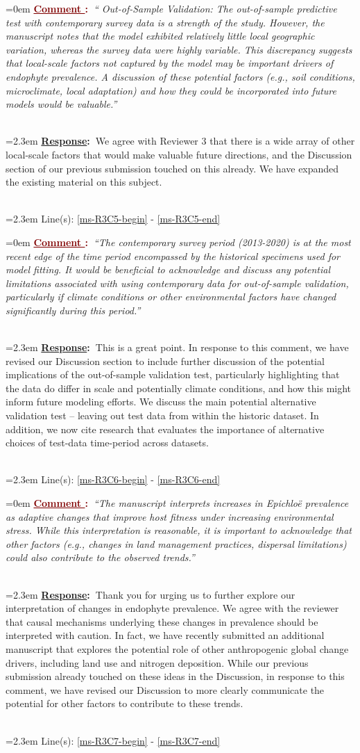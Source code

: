 \documentclass[12pt]{article}
\newcounter{cN}
\newcommand{\comment}[1]{
	\vspace{2em}
	\refstepcounter{cN} %
	\noindent \hangindent=0em \textbf{\textcolor{Maroon}{\uline{Comment \thecN}:~}}\emph{``#1''}
	}
\newcommand{\response}[1]{
	\\[0.25em]
	\hangindent=2.3em \textbf{\textcolor{NavyBlue}{\uline{Response}:~}}#1
	}
\newcommand{\linesref}[2]{
		\\[0.25em]
	\hangindent=2.3em {\color{Mahogany} Line(s): \ref{#1} - \ref{#2}}
}
\begin{document}
\comment{ Out-of-Sample Validation: The out-of-sample predictive test with contemporary survey data is a strength of the study. However, the manuscript notes that the model exhibited relatively little local geographic variation, whereas the survey data were highly variable. This discrepancy suggests that local-scale factors not captured by the model may be important drivers of endophyte prevalence. A discussion of these potential factors (e.g., soil conditions, microclimate, local adaptation) and how they could be incorporated into future models would be valuable.}
\response{We agree with Reviewer 3 that there is a wide array of other local-scale factors that would make valuable future directions, and the Discussion section of our previous submission touched on this already. We have expanded the existing material on this subject.}
\linesref{ms-R3C5-begin}{ms-R3C5-end}


\comment{The contemporary survey period (2013-2020) is at the most recent edge of the time period encompassed by the historical specimens used for model fitting. It would be beneficial to acknowledge and discuss any potential limitations associated with using contemporary data for out-of-sample validation, particularly if climate conditions or other environmental factors have changed significantly during this period.}
\response{This is a great point. In response to this comment, we have revised our Discussion section to include further discussion of the potential implications of the out-of-sample validation test, particularly highlighting that the data do differ in scale and potentially climate conditions, and how this might inform future modeling efforts. We discuss the main potential alternative validation test -- leaving out test data from within the historic dataset. In addition, we now cite research that evaluates the importance of alternative choices of test-data time-period across datasets.}
\linesref{ms-R3C6-begin}{ms-R3C6-end}


\comment{The manuscript interprets increases in Epichloë prevalence as adaptive changes that improve host fitness under increasing environmental stress. While this interpretation is reasonable, it is important to acknowledge that other factors (e.g., changes in land management practices, dispersal limitations) could also contribute to the observed trends.}
\response{Thank you for urging us to further explore our interpretation of changes in endophyte prevalence. We agree with the reviewer that causal mechanisms underlying these changes in prevalence should be interpreted with caution. In fact, we have recently submitted an additional manuscript that explores the potential role of other anthropogenic global change drivers, including land use and nitrogen deposition. While our previous submission already touched on these ideas in the Discussion, in response to this comment, we have revised our Discussion to more clearly communicate the potential for other factors to contribute to these trends.}
\linesref{ms-R3C7-begin}{ms-R3C7-end}
\end{document}
